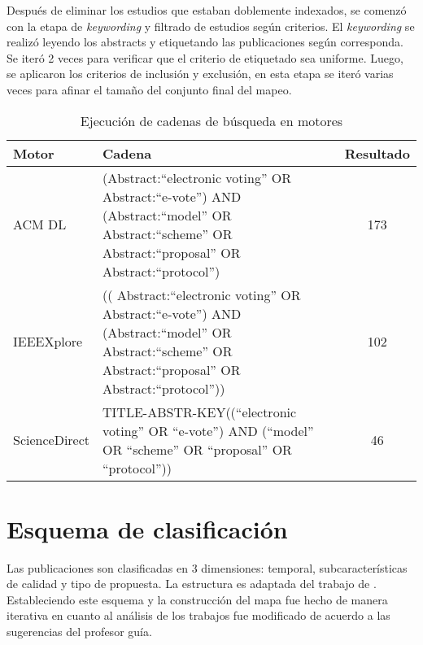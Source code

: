 Después de eliminar los estudios que estaban doblemente
indexados, se comenzó con la etapa de \textit{keywording} y filtrado de
estudios según criterios. El \textit{keywording} se realizó leyendo los abstracts y etiquetando las
publicaciones según corresponda. Se iteró 2 veces para verificar que el 
criterio de etiquetado sea uniforme. Luego, se aplicaron los criterios de inclusión
y exclusión, en esta etapa se iteró varias veces para afinar el tamaño del conjunto
final del mapeo.


\begin{table}[h!]
\centering
\caption{Ejecución de cadenas de búsqueda en motores}
\label{tab:ejecucion-cadenas}
\begin{tabularx}{\textwidth}{p{3cm} X c} 
\toprule[1.5pt]
\bf	Motor		& \bf  Cadena	& 	\bf Resultado \\ \hline
ACM DL			& (Abstract:``electronic voting'' OR Abstract:``e-vote'') AND 
				(Abstract:``model'' OR Abstract:``scheme'' OR Abstract:``proposal'' 
				OR Abstract:``protocol'')										&	173	\\
				
IEEEXplore		&  (( Abstract:``electronic voting'' OR Abstract:``e-vote'') AND 
				(Abstract:``model'' OR Abstract:``scheme'' OR Abstract:``proposal'' 
				OR Abstract:``protocol''))										&	102	\\
ScienceDirect		& TITLE-ABSTR-KEY((``electronic voting'' OR ``e-vote'') AND (``model'' OR ``scheme'' OR ``proposal'' 
				OR ``protocol''))											&	46 	\\			
\bottomrule[0.5pt]
\end {tabularx}
\end{table}
\bigskip



\section{Esquema de clasificación}

Las publicaciones son clasificadas en 3 dimensiones: temporal, 
subcaracterísticas de calidad y tipo de propuesta. La estructura
es adaptada del trabajo de \cite{Petersen2007}. Estableciendo este 
esquema y la construcción del mapa fue hecho de manera iterativa
en cuanto al análisis de los trabajos fue modificado de acuerdo a las
sugerencias del profesor guía. 

